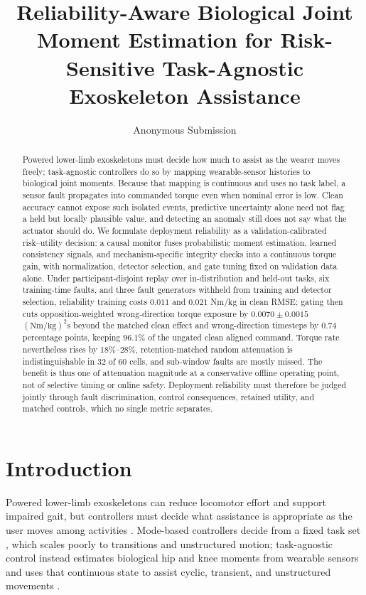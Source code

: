 \documentclass[letterpaper]{article} %
\title{Reliability-Aware Biological Joint Moment Estimation for Risk-Sensitive Task-Agnostic Exoskeleton Assistance}
\author{Anonymous Submission}
\begin{document}
\maketitle

\begin{abstract}
Powered lower-limb exoskeletons must decide how much to assist as the wearer moves freely; task-agnostic controllers do so by mapping wearable-sensor histories to biological joint moments. Because that mapping is continuous and uses no task label, a sensor fault propagates into commanded torque even when nominal error is low. Clean accuracy cannot expose such isolated events, predictive uncertainty alone need not flag a held but locally plausible value, and detecting an anomaly still does not say what the actuator should do. We formulate deployment reliability as a validation-calibrated risk--utility decision: a causal monitor fuses probabilistic moment estimation, learned consistency signals, and mechanism-specific integrity checks into a continuous torque gain, with normalization, detector selection, and gate tuning fixed on validation data alone. Under participant-disjoint replay over in-distribution and held-out tasks, six training-time faults, and three fault generators withheld from training and detector selection, reliability training costs $0.011$ and $0.021$ Nm/kg in clean RMSE; gating then cuts opposition-weighted wrong-direction torque exposure by $0.0070\pm0.0015$ $(\mathrm{Nm/kg})^2\mathrm{s}$ beyond the matched clean effect and wrong-direction timesteps by $0.74$ percentage points, keeping $96.1\%$ of the ungated clean aligned command. Torque rate nevertheless rises by $18\%$--$28\%$, retention-matched random attenuation is indistinguishable in $32$ of $60$ cells, and sub-window faults are mostly missed. The benefit is thus one of attenuation magnitude at a conservative offline operating point, not of selective timing or online safety. Deployment reliability must therefore be judged jointly through fault discrimination, control consequences, retained utility, and matched controls, which no single metric separates.
\end{abstract}


\section{Introduction}
Powered lower-limb exoskeletons can reduce locomotor effort and support impaired gait, but controllers must decide what assistance is appropriate as the user moves among activities \citep{young2017state,kim2019exosuit,awad2017soft,siviy2023opportunities}.
Mode-based controllers decide from a fixed task set \citep{camargo2021classification,kang2022classification}, which scales poorly to transitions and unstructured motion; task-agnostic control instead estimates biological hip and knee moments from wearable sensors and uses that continuous state to assist cyclic, transient, and unstructured movements \citep{molinaro2022hip,molinaro2024unifies,molinaro2024task}.
\end{document}
